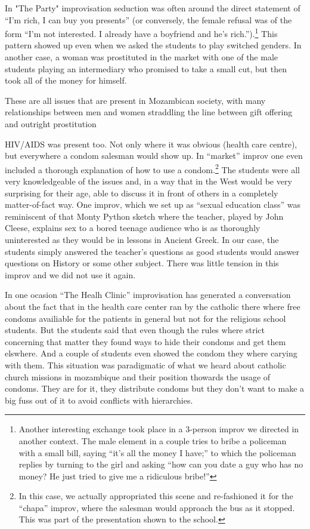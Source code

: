 \documentclass[article,twocolumn,twoside]{memoir}
\begin{document}
In "The Party" improvisation seduction was often around the direct statement of
``I'm rich, I can buy you presents'' (or conversely, the female refusal was of
the form ``I'm not interested. I already have a boyfriend and he's
rich.'').\footnote{Another interesting exchange took place in a 3-person improv
we directed in another context. The male element in a couple tries to bribe a
policeman with a small bill, saying ``it's all the money I have;'' to which the
policeman replies by turning to the girl and asking ``how can you date a guy
who has no money? He just tried to give me a ridiculous bribe!''} This pattern
showed up even when we asked the students to play switched genders. In another
case, a woman was prostituted in the market with one of the male students
playing an intermediary who promised to take a small cut, but then took all of
the money for himself.

These are all issues that are present in Mozambican society, with many
relationships between men and women straddling the line between gift offering
and outright prostitution

HIV/AIDS was present too. Not only where it was obvious (health care centre),
but everywhere a condom salesman would show up. In ``market''
improv one even included a thorough explanation of how to use a condom.\footnote{In
this case, we actually appropriated this scene and re-fashioned it for the
``chapa'' improv, where the salesman would approach the bus as it stopped. This
was part of the presentation shown to the school.} The students were all
very knowledgeable of the issues and, in a way that in the West would be very
surprising for their age, able to discuss it in front of others in a completely
matter-of-fact way. One improv, which we set up as ``sexual education class''
was reminiscent of that Monty Python sketch where the teacher, played by John
Cleese, explains sex to a bored teenage audience who is as thoroughly
uninterested as they would be in lessons in Ancient Greek. In our case, the
students simply answered the teacher's questions as good students would answer
questions on History or some other subject. There was little tension in this
improv and we did not use it again.

In one ocasion ``The Healh Clinic'' improvisation has generated a conversation
about the fact that in the health care center ran by the catholic there where
free condoms availiable for the patients in general but not for the religious
school students. But the students said that even though the rules where strict
concerning that matter they found ways to hide their condoms and get them
elswhere. And a couple of students even showed the condom they where carying
with them. This situation was paradigmatic of what we heard about catholic
church missions in mozambique and their position thowards the usage of condoms.
They are for it, they distribute condoms but they don't want to make a big fuss
out of it to avoid conflicts with hierarchies.
\end{document}

